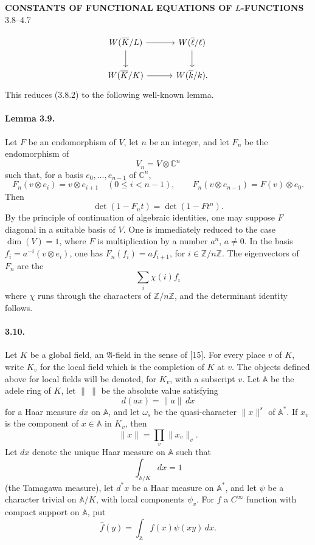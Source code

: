 \documentclass[10pt]{article}
\newcommand{\C}{\mathbb C}
\newcommand{\Z}{\mathbb Z}
\begin{document}
\begin{center}
{\Large\bfseries CONSTANTS OF FUNCTIONAL EQUATIONS OF \(L\)-FUNCTIONS}\\[0.4em]
{\normalsize 3.8--4.7}
\end{center}


\[
\begin{tikzcd}[column sep=3.0em,row sep=2.0em]
W(\overline K/L)\arrow[r]\arrow[d]&W(\overline\ell/\ell)\arrow[d]\\
W(\overline K/K)\arrow[r]&W(\overline k/k).
\end{tikzcd}
\]
This reduces (3.8.2) to the following well-known lemma.

\paragraph{Lemma 3.9.} Let \(F\) be an endomorphism of \(V\), let \(n\) be an integer, and let \(F_n\) be the endomorphism of
\[
V_n=V\otimes\C^n
\]
such that, for a basis \(e_0,\ldots,e_{n-1}\) of \(\C^n\),
\[
F_n(v\otimes e_i)=v\otimes e_{i+1}\quad(0\le i<n-1),
\qquad
F_n(v\otimes e_{n-1})=F(v)\otimes e_0.
\]
Then
\[
\det(1-F_nt)=\det(1-Ft^n).
\]
By the principle of continuation of algebraic identities, one may suppose \(F\) diagonal in a suitable basis of \(V\). One is immediately reduced to the case \(\dim(V)=1\), where \(F\) is multiplication by a number \(a^n\), \(a\ne0\). In the basis \(f_i=a^{-i}(v\otimes e_i)\), one has \(F_n(f_i)=af_{i+1}\), for \(i\in\Z/n\Z\). The eigenvectors of \(F_n\) are the
\[
\sum_i\chi(i)f_i
\]
where \(\chi\) runs through the characters of \(\Z/n\Z\), and the determinant identity follows.

\paragraph{3.10.} Let \(K\) be a global field, an \(\mathfrak A\)-field in the sense of [15]. For every place \(v\) of \(K\), write \(K_v\) for the local field which is the completion of \(K\) at \(v\). The objects defined above for local fields will be denoted, for \(K_v\), with a subscript \(v\). Let \(\mathbb A\) be the adele ring of \(K\), let \(\|\ \|\) be the absolute value satisfying
\[
d(ax)=\|a\|\,dx
\]
for a Haar measure \(dx\) on \(\mathbb A\), and let \(\omega_s\) be the quasi-character \(\|x\|^s\) of \(\mathbb A^*\). If \(x_v\) is the component of \(x\in\mathbb A\) in \(K_v\), then
\[
\|x\|=\prod_v\|x_v\|_v.
\]
Let \(dx\) denote the unique Haar measure on \(\mathbb A\) such that
\[
\int_{\mathbb A/K}dx=1
\]
(the Tamagawa measure), let \(d^*x\) be a Haar measure on \(\mathbb A^*\), and let \(\psi\) be a character trivial on \(\mathbb A/K\), with local components \(\psi_v\). For \(f\) a \(C^\infty\) function with compact support on \(\mathbb A\), put
\[
\widehat f(y)=\int_{\mathbb A}f(x)\psi(xy)\,dx.
\]
\end{document}
